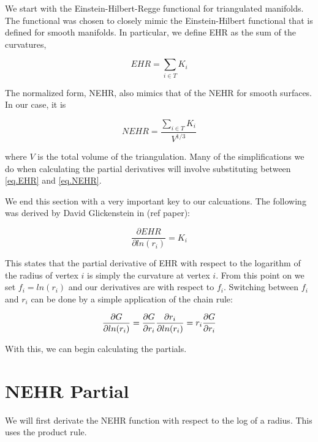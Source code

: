 \documentclass[12pt]{article}
\begin{document}
We start with the Einstein-Hilbert-Regge functional for triangulated
manifolds. The functional was chosen to closely mimic the Einstein-Hilbert
functional that is defined for smooth manifolds. In particular, we define
EHR as the sum of the curvatures,

\begin{equation}
EHR = \sum_{{i} \in T}{K_i}  \label{eq.EHR}
\end{equation}

The normalized form, NEHR, also mimics that of the NEHR for smooth surfaces.
In our case, it is

\begin{equation}
NEHR = \frac{\sum_{{i} \in T}{K_i}}{V^{1/3}}  \label{eq.NEHR}
\end{equation}

where $V$ is the total volume of the triangulation. Many of the
simplifications we do when calculating the partial derivatives will involve
substituting between \ref{eq.EHR} and \ref{eq.NEHR}.

We end this section with a very important key to our calcuations. The
following was derived by David Glickenstein in (ref paper):

\begin{equation}
\frac{\partial EHR}{\partial ln(r_i)} = K_i  \label{eq.EHR_Part}
\end{equation}

This states that the partial derivative of EHR with respect to the logarithm
of the radius of vertex ${i}$ is simply the curvature at vertex ${i}$. From
this point on we set $f_i = ln(r_i)$ and our derivatives are with respect to 
$f_i$. Switching between $f_i$ and $r_i$ can be done by a simple application
of the chain rule:

\begin{equation}
\frac{\partial G}{\partial ln(r_{i})}=\frac{\partial G}{\partial r_{i}}\frac{%
\partial r_{i}}{\partial ln(r_{i})}=r_{i}\frac{\partial G}{\partial r_{i}}
\label{eq.log_r}
\end{equation}

With this, we can begin calculating the partials.

\section{NEHR Partial}

We will first derivate the NEHR function with respect to the log of a
radius. This uses the product rule.
\end{document}
